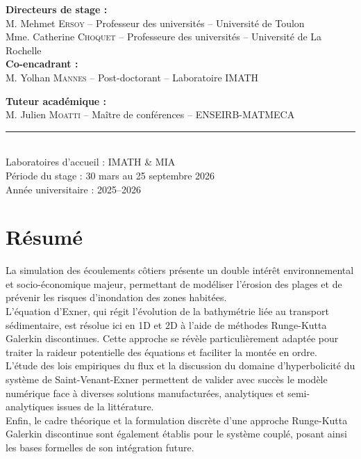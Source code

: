 \documentclass[11pt, a4paper, oneside]{report}
\begin{document}
\begin{titlepage}
\begin{minipage}[t]{0.8\textwidth}
        \textbf{Directeurs de stage :} \\
        M. Mehmet \textsc{Ersoy} -- Professeur des universités -- Université de Toulon \\[0.1cm]
        Mme. Catherine \textsc{Choquet} -- Professeure des universités -- Université de La Rochelle \\[0.25cm]
        \textbf{Co-encadrant :} \\
        M. Yolhan \textsc{Mannes} -- Post-doctorant -- Laboratoire IMATH

        \vspace{0.4cm}

        \textbf{Tuteur académique :} \\
        M. Julien \textsc{Moatti} -- Maître de conférences -- ENSEIRB-MATMECA
    \end{minipage}

    \vfill

    \begin{center}
        \rule{0.5\textwidth}{0.4pt}\\[0.3cm]
        Laboratoires d'accueil : IMATH \& MIA \\
        Période du stage : 30 mars au 25 septembre 2026 \\
        Année universitaire : 2025--2026
    \end{center}

\end{titlepage}

\section*{Résumé}

La simulation des écoulements côtiers présente un double intérêt environnemental et socio-économique majeur, permettant de modéliser l'érosion des plages et de prévenir les risques d'inondation des zones habitées. \\
L'équation d'Exner, qui régit l'évolution de la bathymétrie liée au transport sédimentaire, est résolue ici en 1D et 2D à l'aide de méthodes Runge-Kutta Galerkin discontinues. Cette approche se révèle particulièrement adaptée pour traiter la raideur potentielle des équations et faciliter la montée en ordre. \\
L'étude des lois empiriques du flux et la discussion du domaine d'hyperbolicité du système de Saint-Venant-Exner permettent de valider avec succès le modèle numérique face à diverses solutions manufacturées, analytiques et semi-analytiques issues de la littérature. \\
Enfin, le cadre théorique et la formulation discrète d'une approche Runge-Kutta Galerkin discontinue sont également établis pour le système couplé, posant ainsi les bases formelles de son intégration future.
\end{document}
